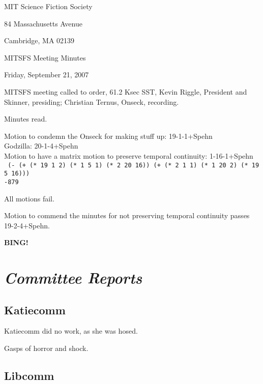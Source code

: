 \documentclass[10pt]{article}
\newcommand{\bing}{{\bf BING!} }
\newcommand{\goto}[1]{\bing \vskip 12pt \section*{{\em{#1}}}}
\begin{document}
\begin{center}

MIT Science Fiction Society

84 Massachusetts Avenue

Cambridge, MA 02139

\vspace{12pt}

MITSFS Meeting Minutes

Friday, September 21, 2007

\end{center}

\vspace{18pt}

\setlength{\parskip}{6pt}

\noindent
MITSFS meeting called to order, 61.2 Ksec SST,
Kevin Riggle, President and Skinner, presiding; Christian Ternus, Onseck, recording.

Minutes read.

Motion to condemn the Onseck for making stuff up: 19-1-1+Spehn\\
Godzilla: 20-1-4+Spehn\\
Motion to have a matrix motion to preserve temporal continuity: 1-16-1+Spehn\\

\texttt{ (- (+ (* 19 1 2) (* 1 5 1) (* 2 20 16)) (+ (* 2 1 1) (* 1 20 2) (* 19 5 16)))\\
-879}

All motions fail.

Motion to commend the minutes for not preserving temporal continuity passes 19-2-4+Spehn.

\BING

\goto{Committee Reports}


\subsection*{Katiecomm}

Katiecomm did no work, as she was hosed.

Gasps of horror and shock.

\subsection*{Libcomm}
\end{document}
